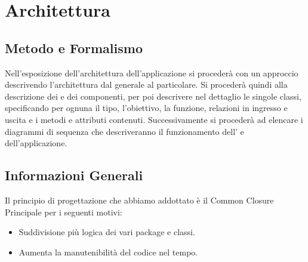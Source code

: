 \newpage
\section{Architettura}

\subsection{Metodo e Formalismo}
Nell’esposizione dell’architettura dell’applicazione si procederà con un approccio  descrivendo l’architettura dal generale al particolare. Si procederà quindi alla descrizione dei
 e dei componenti, per poi descrivere nel dettaglio le singole classi, specificando per
ognuna il tipo, l’obiettivo, la funzione, relazioni in ingresso e uscita e i metodi e attributi contenuti. Successivamente si procederà ad elencare i diagrammi di sequenza che descriveranno il funzionamento dell' e dell'applicazione. 


\subsection{Informazioni Generali}
Il principio di progettazione che abbiamo addottato è il Common Closure Principale per i seguenti motivi:
\begin{itemize}
\item Suddivisione più logica dei vari package e classi.
\item Aumenta la manutenibilità del codice nel tempo.
\end{itemize}






\newpage